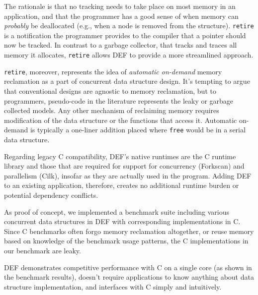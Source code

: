 The rationale is that no tracking needs to take place on most memory in an application, and that the programmer has a good sense of when memory can \textit{probably} be deallocated (e.g., when a node is removed from the structure).  \texttt{retire} is a notification the programmer provides to the compiler that a pointer should now be tracked.  In contrast to a garbage collector, that tracks and traces all memory it allocates, \texttt{retire} allows DEF to provide a more streamlined approach.

\texttt{retire}, moreover, represents the idea of \textit{automatic on-demand} memory reclamation as a part of concurrent data structure design.  It's tempting to argue that conventional designs are agnostic to memory reclamation, but to programmers, pseudo-code in the literature represents the leaky or garbage collected models.  Any other mechanism of reclaiming memory requires modification of the data structure or the functions that access it.  Automatic on-demand is typically a one-liner addition placed where \texttt{free} would be in a serial data structure.

Regarding legacy C compatibility, DEF's native runtimes are the C runtime library and those that are required for support for concurrency (Forkscan\cite{Forkscan}) and parallelism (Cilk\cite{BlumofeCilk}), insofar as they are actually used in the program.  Adding DEF to an existing application, therefore, creates no additional runtime burden or potential dependency conflicts.

As proof of concept, we implemented a benchmark suite including various concurrent data structures in DEF with corresponding implementations in C.  Since C benchmarks often forgo memory reclamation altogether, or reuse memory based on knowledge of the benchmark usage patterns,\cite{Synchrobench, Scal} the C implementations in our benchmark are leaky.

DEF demonstrates competitive performance with C on a single core (as shown in the benchmark results), doesn't require applications to know anything about data structure implementation, and interfaces with C simply and intuitively.
